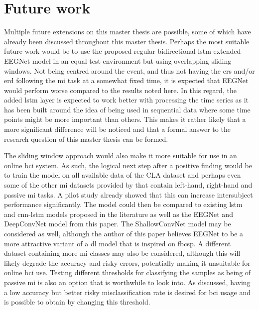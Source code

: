 \section{Future work}
\label{sec:discussion_future_work}

Multiple future extensions on this master thesis are possible, some of which have already been discussed throughout this master thesis.
Perhaps the most suitable future work would be to use the proposed regular bidirectional \gls{lstm} extended EEGNet model in an equal test environment but using overlapping sliding windows.
Not being centred around the event, and thus not having the \gls{ers} and/or \gls{erd} following the \gls{mi} task at a somewhat fixed time, it is expected that EEGNet would perform worse compared to the results noted here.
In this regard, the added \gls{lstm} layer is expected to work better with processing the time series as it has been built around the idea of being used in sequential data where some time points might be more important than others.
This makes it rather likely that a more significant difference will be noticed and that a formal answer to the research question of this master thesis can be formed.

The sliding window approach would also make it more suitable for use in an online \gls{bci} system.
As such, the logical next step after a positive finding would be to train the model on all available data of the CLA dataset and perhaps even some of the other \gls{mi} datasets provided by \citet{eeg_data} that contain left-hand, right-hand and passive \gls{mi} tasks.
A pilot study already showed that this can increase intersubject performance significantly.
The model could then be compared to existing \gls{lstm} and \gls{cnn}-\gls{lstm} models proposed in the literature as well as the EEGNet and DeepConvNet model from this paper.
The ShallowConvNet model may be considered as well, although the author of this paper believes EEGNet to be a more attractive variant of a \gls{dl} model that is inspired on \gls{fbcsp}.
A different dataset containing more \gls{mi} classes may also be considered, although this will likely degrade the accuracy and risky errors, potentially making it unsuitable for online \gls{bci} use.
Testing different thresholds for classifying the samples as being of passive \gls{mi} is also an option that is worthwhile to look into.
As discussed, having a low accuracy but better risky misclassification rate is desired for \gls{bci} usage and is possible to obtain by changing this threshold.

